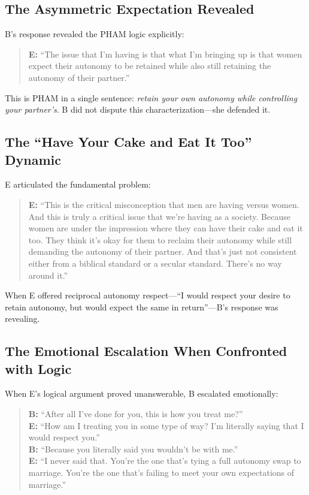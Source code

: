 \documentclass[12pt,openany]{book}
\numberwithin{equation}{chapter}
\begin{document}
\subsection{The Asymmetric Expectation Revealed}

B's response revealed the PHAM logic explicitly:

\begin{quote}
\textbf{E:} ``The issue that I'm having is that what I'm bringing up is that women expect their autonomy to be retained while also still retaining the autonomy of their partner.''
\end{quote}

This is PHAM in a single sentence: \textit{retain your own autonomy while controlling your partner's}. B did not dispute this characterization---she defended it.

\subsection{The ``Have Your Cake and Eat It Too'' Dynamic}

E articulated the fundamental problem:

\begin{quote}
\textbf{E:} ``This is the critical misconception that men are having versus women. And this is truly a critical issue that we're having as a society. Because women are under the impression where they can have their cake and eat it too. They think it's okay for them to reclaim their autonomy while still demanding the autonomy of their partner. And that's just not consistent either from a biblical standard or a secular standard. There's no way around it.''
\end{quote}

When E offered reciprocal autonomy respect---``I would respect your desire to retain autonomy, but would expect the same in return''---B's response was revealing.

\subsection{The Emotional Escalation When Confronted with Logic}

When E's logical argument proved unanswerable, B escalated emotionally:

\begin{quote}
\textbf{B:} ``After all I've done for you, this is how you treat me?''\\
\textbf{E:} ``How am I treating you in some type of way? I'm literally saying that I would respect you.''\\
\textbf{B:} ``Because you literally said you wouldn't be with me.''\\
\textbf{E:} ``I never said that. You're the one that's tying a full autonomy swap to marriage. You're the one that's failing to meet your own expectations of marriage.''
\end{quote}
\end{document}
